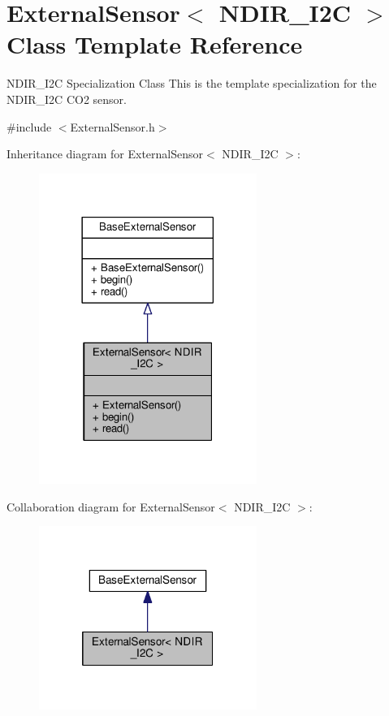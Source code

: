 \hypertarget{class_external_sensor_3_01_n_d_i_r___i2_c_01_4}{}\section{External\+Sensor$<$ N\+D\+I\+R\+\_\+\+I2C $>$ Class Template Reference}
\label{class_external_sensor_3_01_n_d_i_r___i2_c_01_4}


N\+D\+I\+R\+\_\+\+I2C Specialization Class This is the template specialization for the N\+D\+I\+R\+\_\+\+I2C C\+O2 sensor.  




{\ttfamily \#include $<$External\+Sensor.\+h$>$}



Inheritance diagram for External\+Sensor$<$ N\+D\+I\+R\+\_\+\+I2C $>$\+:\nopagebreak
\begin{figure}[H]
\begin{center}
\leavevmode
\includegraphics[width=201pt]{class_external_sensor_3_01_n_d_i_r___i2_c_01_4__inherit__graph}
\end{center}
\end{figure}


Collaboration diagram for External\+Sensor$<$ N\+D\+I\+R\+\_\+\+I2C $>$\+:\nopagebreak
\begin{figure}[H]
\begin{center}
\leavevmode
\includegraphics[width=201pt]{class_external_sensor_3_01_n_d_i_r___i2_c_01_4__coll__graph}
\end{center}
\end{figure}
